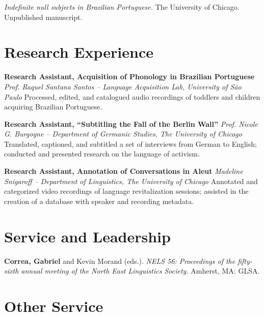 \documentclass[11pt,letterpaper,roman]{moderncv}
\begin{document}
    {\emph{Indefinite null subjects in Brazilian Portuguese.}
    \newline The University of Chicago. Unpublished manuscript.}

\section{Research Experience}

    {\textbf{Research Assistant, Acquisition of Phonology in Brazilian Portuguese}
    \newline \textit{Prof. Raquel Santana Santos -- Language Acquisition Lab, University of São Paulo} 
    \newline Processed, edited, and catalogued audio recordings of toddlers and children acquiring Brazilian Portuguese.}

    {\textbf{Research Assistant, ``Subtitling the Fall of the Berlin Wall''}
    \newline \textit{Prof. Nicole G. Burgoyne -- Department of Germanic Studies, The University of Chicago}
    \newline Translated, captioned, and subtitled a set of interviews from German to English;
    \newline conducted and presented research on the language of activism.}

    {\textbf{Research Assistant, Annotation of Conversations in Aleut}
    \newline \textit{Madeline Snigaroff -- Department of Linguistics, The University of Chicago}
    \newline 	Annotated and categorized video recordings of language revitalization sessions; assisted in the creation of a database with speaker and recording metadata.}

\section{Service and Leadership}

    {\textbf{Correa, Gabriel} and Kevin Morand (eds.). \emph{NELS 56: Proceedings of the fifty-sixth annual meeting of the North East Linguistics Society.} Amherst, MA: GLSA.}

\section{Other Service}
\end{document}
